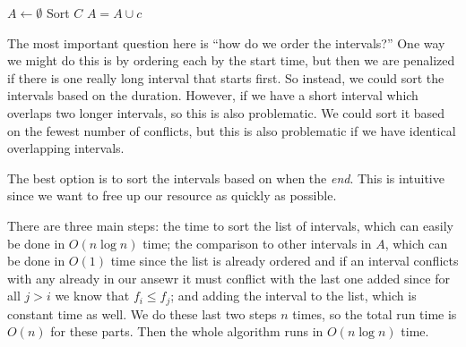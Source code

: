 \begin{algorithm}
\begin{algorithmic}[]


\State $A \gets \emptyset$
\State Sort $C$
	 \State $A = A \cup c$ \EndIf
\EndFor
\EndProcedure

\end{algorithmic}
\end{algorithm}

The most important question here is ``how do we order the intervals?'' One way we might do this is by ordering each by the start time, but then we are penalized if there is one really long interval that starts first. So instead, we could sort the intervals based on the duration. However, if we have a short interval which overlaps two longer intervals, so this is also problematic. We could sort it based on the fewest number of conflicts, but this is also problematic if we have identical overlapping intervals. 

The best option is to sort the intervals based on when the \emph{end}. This is intuitive since we want to free up our resource as quickly as possible.

\begin{problem}
There are three main steps: the time to sort the list of intervals, which can easily be done in $O(n\log n)$ time; the comparison to other intervals in $A$, which can be done in $O(1)$ time since the list is already ordered and if an interval conflicts with any already in our ansewr it must conflict with the last one added since for all $j > i$ we know that $f_i \leq f_j$; and adding the interval to the list, which is constant time as well. We do these last two steps $n$ times, so the total run time is $O(n)$ for these parts. Then the whole algorithm runs in $O(n \log n)$ time.
\end{problem}

